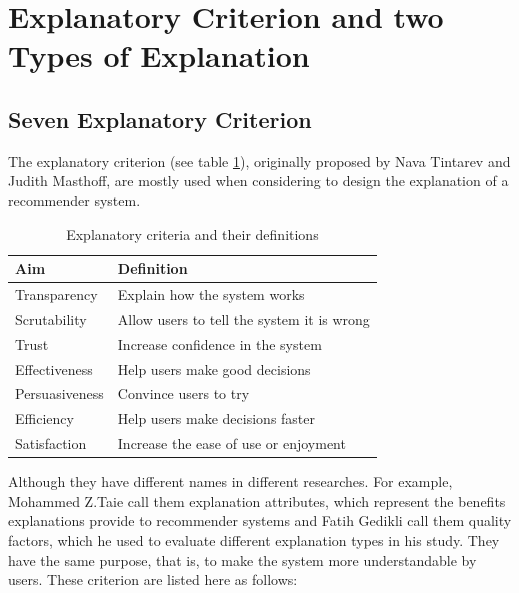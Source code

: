 
\section{Explanatory Criterion and two Types of Explanation}
\subsection{Seven Explanatory Criterion}
    \indent The explanatory criterion\cite{tintarev2007survey} (see table \ref{table:1}), originally proposed by Nava Tintarev and Judith Masthoff, 
    are mostly used when considering to design the explanation of a recommender system. 

    \begin{table}[ht] 
        \centering
        \begin{tabular}{ | m{8em} | m{4cm} |} 
        \hline
         \bfseries Aim & \bfseries Definition\\ [0.5ex] 
        \hline\hline
        Transparency & Explain how the system works\\ 
        \hline
        Scrutability & Allow users to tell the system it is wrong\\ 
        \hline
        Trust & Increase \text{users\textquotesingle} confidence in the system\\ 
        \hline
        Effectiveness & Help users make good decisions\\ 
        \hline
        Persuasiveness & Convince users to try\\ 
        \hline
        Efficiency & Help users make decisions faster\\ 
        \hline
        Satisfaction & Increase the ease of use or enjoyment\\ 
        \hline
        \end{tabular}
        \caption{Explanatory criteria and their definitions}
        \label{table:1}
    \end{table}
    \indent Although they have different names in different researches. For example, 
    Mohammed Z.Taie call them explanation attributes\cite{al2013explanations},
    which represent the benefits explanations provide to recommender systems and Fatih Gedikli call them quality factors, 
    which he used to evaluate different explanation types in his study\cite{gedikli2014should}.
    They have the same purpose, that is, to make the system more understandable by users.
    These criterion are listed here as follows:
    
